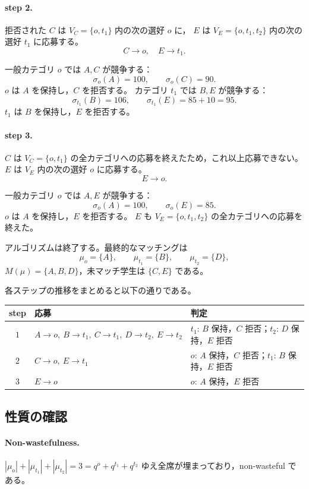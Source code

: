 \documentclass[
  12pt,
  a4paper,
  oneside,
  onecolumn,
  titlepage,
  final
]{jsarticle}
\newcommand{\1}{\mathbf{1}}
\begin{document}
\paragraph{step 2.}
拒否された $C$ は $V_C=\{o,t_1\}$ 内の次の選好 $o$ に，
$E$ は $V_E=\{o,t_1,t_2\}$ 内の次の選好 $t_1$ に応募する。
\[
    C\to o,\quad E\to t_1.
\]
 
一般カテゴリ $o$ では $A,C$ が競争する：
\[
    \sigma_o(A)=100,\qquad \sigma_o(C)=90.
\]
$o$ は $A$ を保持し，$C$ を拒否する。
カテゴリ $t_1$ では $B,E$ が競争する：
\[
    \sigma_{t_1}(B)=106,\qquad \sigma_{t_1}(E)=85+10=95.
\]
$t_1$ は $B$ を保持し，$E$ を拒否する。
 
\paragraph{step 3.}
$C$ は $V_C=\{o,t_1\}$ の全カテゴリへの応募を終えたため，これ以上応募できない。
$E$ は $V_E$ 内の次の選好 $o$ に応募する。
\[
    E\to o.
\]
 
一般カテゴリ $o$ では $A,E$ が競争する：
\[
    \sigma_o(A)=100,\qquad \sigma_o(E)=85.
\]
$o$ は $A$ を保持し，$E$ を拒否する。
$E$ も $V_E=\{o,t_1,t_2\}$ の全カテゴリへの応募を終えた。
 
アルゴリズムは終了する。最終的なマッチングは
\[
    \mu_o=\{A\},\qquad \mu_{t_1}=\{B\},\qquad \mu_{t_2}=\{D\},
\]
$M(\mu)=\{A,B,D\}$，未マッチ学生は $\{C,E\}$ である。
 
各ステップの推移をまとめると以下の通りである。
 
\begin{center}
\begin{tabular}{c|l|l}
step & 応募 & 判定 \\
\hline
$1$ & $A\to o,\ B\to t_1,\ C\to t_1,\ D\to t_2,\ E\to t_2$
    & $t_1$: $B$ 保持，$C$ 拒否；$t_2$: $D$ 保持，$E$ 拒否 \\
$2$ & $C\to o,\ E\to t_1$
    & $o$: $A$ 保持，$C$ 拒否；$t_1$: $B$ 保持，$E$ 拒否 \\
$3$ & $E\to o$
    & $o$: $A$ 保持，$E$ 拒否 \\
\end{tabular}
\end{center}
 
\subsection*{性質の確認}
 
\paragraph{Non-wastefulness.}
$|\mu_o|+|\mu_{t_1}|+|\mu_{t_2}|=3=q^o+q^{t_1}+q^{t_2}$ ゆえ全席が埋まっており，non-wasteful である。
 
\end{document}
